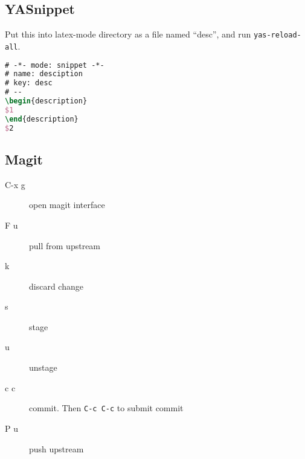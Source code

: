 \subsection{YASnippet}
Put this into latex-mode directory as a file named ``desc'', and run \texttt{yas-reload-all}.
\begin{lstlisting}[language=tex]
# -*- mode: snippet -*-
# name: desciption
# key: desc
# --
\begin{description}
$1
\end{description}
$2
\end{lstlisting}



\subsection{Magit}

\begin{description}
\item [C-x g] open magit interface
\item [F u] pull from upstream
\item [k] discard change
\item [s] stage
\item [u] unstage
\item [c c] commit. Then \texttt{C-c C-c} to submit commit
\item [P u] push upstream
\end{description}


